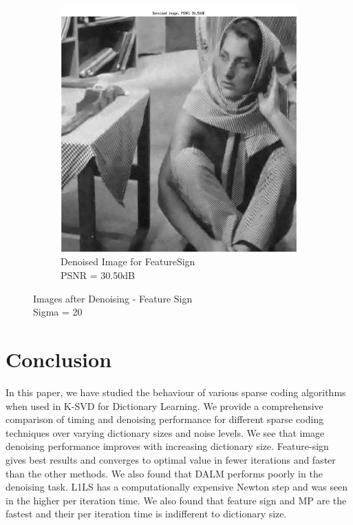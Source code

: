 \documentclass{article} %
\begin{document}
\begin{figure}[H]
\begin{subfigure}[b]{0.5\textwidth}
                \includegraphics[width=\textwidth]{images/Denoised_FeatureSign}
                \caption{Denoised Image for FeatureSign\\PSNR = 30.50dB}
                \label{fig:DenoisedFeatureSign}
        \end{subfigure}
        \caption{Images after Denoising - Feature Sign\\Sigma = 20}\label{fig:DenoiseFeatureSign}
\end{figure}


\section{Conclusion}

In this paper, we have studied the behaviour of various sparse coding algorithms when used in K-SVD for Dictionary Learning.  We provide a comprehensive comparison of timing and denoising performance for different sparse coding techniques over varying dictionary sizes and noise levels. We see that image denoising performance improves with increasing dictionary size. Feature-sign gives best results and converges to optimal value in fewer iterations and faster than the other methods. We also found that DALM performs poorly in the denoising task. L1LS has a computationally expensive Newton step and was seen in the higher per iteration time. We also found that feature sign and MP are the fastest and their per iteration time is indifferent to dictionary size.

\nocite{*}


\end{document}
